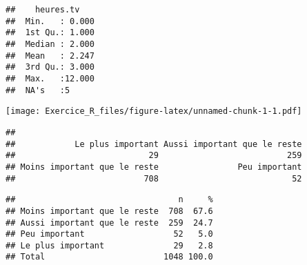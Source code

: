 \documentclass[
]{article}
\newenvironment{Shaded}{\begin{snugshade}}{\end{snugshade}}
\newcommand{\AttributeTok}[1]{\textcolor[rgb]{0.77,0.63,0.00}{#1}}
\newcommand{\CommentTok}[1]{\textcolor[rgb]{0.56,0.35,0.01}{\textit{#1}}}
\newcommand{\ConstantTok}[1]{\textcolor[rgb]{0.00,0.00,0.00}{#1}}
\newcommand{\DecValTok}[1]{\textcolor[rgb]{0.00,0.00,0.81}{#1}}
\newcommand{\FunctionTok}[1]{\textcolor[rgb]{0.00,0.00,0.00}{#1}}
\newcommand{\NormalTok}[1]{#1}
\newcommand{\OtherTok}[1]{\textcolor[rgb]{0.56,0.35,0.01}{#1}}
\newcommand{\SpecialCharTok}[1]{\textcolor[rgb]{0.00,0.00,0.00}{#1}}
\newcommand{\StringTok}[1]{\textcolor[rgb]{0.31,0.60,0.02}{#1}}
\begin{document}
\begin{verbatim}
##    heures.tv     
##  Min.   : 0.000  
##  1st Qu.: 1.000  
##  Median : 2.000  
##  Mean   : 2.247  
##  3rd Qu.: 3.000  
##  Max.   :12.000  
##  NA's   :5
\end{verbatim}

\begin{Shaded}
\end{Shaded}

\texttt{[image: Exercice\_R\_files/figure-latex/unnamed-chunk-1-1.pdf]}

\begin{Shaded}
\end{Shaded}

\begin{verbatim}
## 
##            Le plus important Aussi important que le reste 
##                           29                          259 
## Moins important que le reste                Peu important 
##                          708                           52
\end{verbatim}

\begin{Shaded}
\end{Shaded}

\begin{verbatim}
##                                 n     %
## Moins important que le reste  708  67.6
## Aussi important que le reste  259  24.7
## Peu important                  52   5.0
## Le plus important              29   2.8
## Total                        1048 100.0
\end{verbatim}
\end{document}
